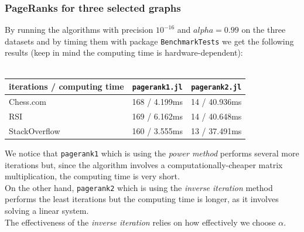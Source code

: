 \documentclass[unicode,11pt,a4paper,oneside,numbers=endperiod,openany]{scrartcl}
\begin{document}

\clearpage
\subsubsection{PageRanks for three selected graphs}

By running the algorithms with precision $10^{-16}$ and $alpha=0.99$ on the three datasets and by timing them with package \texttt{BenchmarkTests} we get the following results (keep in mind the computing time is hardware-dependent):\\\\
\begin{table}[h]
    \centering
    \begin{tabular}{l|c|c}
         iterations / computing time & \texttt{pagerank1.jl} & \texttt{pagerank2.jl}\\
         \hline
         Chess.com      & 168 / 4.199ms & 14 / 40.936ms \\
         RSI            & 169 / 6.162ms & 14 / 40.648ms \\
         StackOverflow  & 160 / 3.555ms & 13 / 37.491ms \\
    \end{tabular}
    \label{table:ex5.4}
\end{table}


We notice that \texttt{pagerank1} which is using the \textit{power method} performs several more iterations but, since the algorithm involves a computationally-cheaper matrix multiplication, the computing time is very short.\\
On the other hand, \texttt{pagerank2} which is using the \textit{inverse iteration} method performs the least iterations but the computing time is longer, as it involves solving a linear system.\\
The effectiveness of the \textit{inverse iteration} relies on how effectively we choose $\alpha$.
\end{document}
